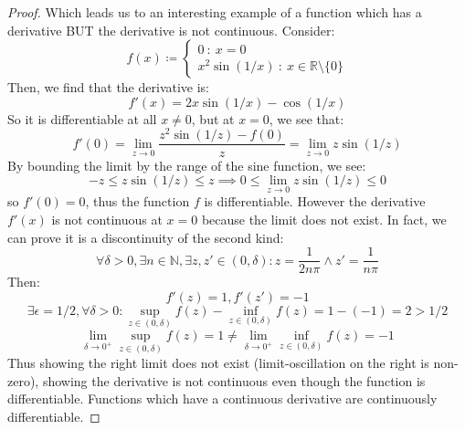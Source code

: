\documentclass[10pt,letterpaper]{article} %
\begin{document}
\begin{proof}
Which leads us to an interesting example of a function which has a derivative BUT the derivative is not continuous. Consider:
\begin{equation*}
f(x) \coloneq \begin{cases*}
  0 \ : \ x = 0\\
  x^2\sin(1/x) \ : \ x \in \mathbb{R}\setminus \{0\}
\end{cases*}
\end{equation*}
Then, we find that the derivative is:
\begin{equation*}
f'(x) = 2x\sin(1/x) - \cos(1/x)
\end{equation*}
So it is differentiable at all $x \neq 0$, but at $x=0$, we see that:
\begin{equation*}
f'(0) = \lim_{z \xrightarrow{} 0}\frac{z^2\sin(1/z) - f(0)}{z} = \lim_{z \xrightarrow{} 0}z\sin(1/z)
\end{equation*}
By bounding the limit by the range of the sine function, we see:
\begin{equation*}
-z \leqslant z\sin(1/z) \leqslant z \implies 0 \leqslant \lim_{z \xrightarrow{} 0}z\sin(1/z) \leqslant 0
\end{equation*}
so $f'(0) = 0$, thus the function $f$ is differentiable. However the derivative $f'(x)$ is not continuous at $x = 0$ because the limit does not exist. In fact, we can prove it is a discontinuity of the second kind:
\begin{equation*}
\forall \delta > 0, \exists n \in \mathbb{N}, \exists z, z' \in (0, \delta): z = \frac{1}{2n\pi} \land z' = \frac{1}{n\pi} 
\end{equation*}
Then:
\begin{equation*}
f'(z) = 1, f'(z') = -1
\end{equation*}
\begin{equation*}
\exists \epsilon = 1/2, \forall \delta > 0: \sup_{z \in (0, \delta)}f(z) - \inf_{z \in (0, \delta)}f(z) = 1 - (-1) = 2 > 1/2
\end{equation*}
\begin{equation*}
\lim_{\delta \xrightarrow{} 0^+}\sup_{z \in (0, \delta)}f(z) = 1 \neq \lim_{\delta \xrightarrow{} 0^+}\inf_{z \in (0, \delta)}f(z) = -1
\end{equation*}
Thus showing the right limit does not exist (limit-oscillation on the right is non-zero), showing the derivative is not continuous even though the function is differentiable. Functions which have a continuous derivative are continuously differentiable.
\end{proof}
\end{document}
